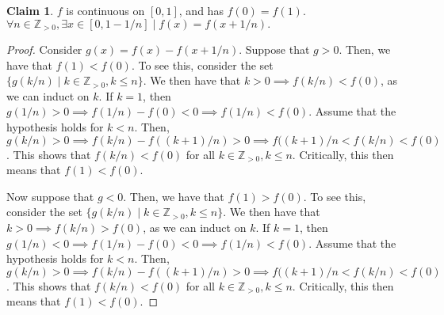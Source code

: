 \documentclass[12pt,letterpaper]{article}
\theoremstyle{definition}
\newtheorem*{claim}{Claim}
\newcommand{\Zg}{\mathbb{Z}_{>0}}
\begin{document}
\begin{claim}
  $f$ is continuous on $[0,1]$, and has $f(0) = f(1)$. $\forall n \in \Zg,
  \exists x \in [0,1 - 1/n] \mid f(x) = f(x + 1/n).$
\end{claim}

\begin{proof}



  Consider $g(x) = f(x) - f(x + 1/n)$. Suppose that $g > 0$. Then, we have that
  $f(1) < f(0)$. To see this, consider the set $\{ g(k/n) \mid k \in \Zg, k \leq
  n\}.$ We then have that $k > 0 \implies f(k/n) < f(0)$, as we can induct on
  $k$. If $k = 1$, then $g(1/n) > 0 \implies f(1/n) - f(0) < 0 \implies f(1/n) <
  f(0)$. Assume that the hypothesis holds for $k < n$. Then, $g(k/n) > 0
  \implies f(k/n) - f((k+1)/n) > 0 \implies f((k+1)/n <  f(k/n) < f(0)$. This
  shows that $f(k/n) < f(0)$ for all $k \in \Zg, k \leq n$. Critically, this
  then means that $f(1) < f(0)$.

  Now suppose that $g < 0$. Then, we have that
  $f(1) > f(0)$. To see this, consider the set $\{ g(k/n) \mid k \in \Zg, k \leq
  n\}.$ We then have that $k > 0 \implies f(k/n) > f(0)$, as we can induct on
  $k$. If $k = 1$, then $g(1/n) < 0 \implies f(1/n) - f(0) < 0 \implies f(1/n) <
  f(0)$. Assume that the hypothesis holds for $k < n$. Then, $g(k/n) > 0
  \implies f(k/n) - f((k+1)/n) > 0 \implies f((k+1)/n <  f(k/n) < f(0)$. This
  shows that $f(k/n) < f(0)$ for all $k \in \Zg, k \leq n$. Critically, this
  then means that $f(1) < f(0)$.




\end{proof}
\end{document}
